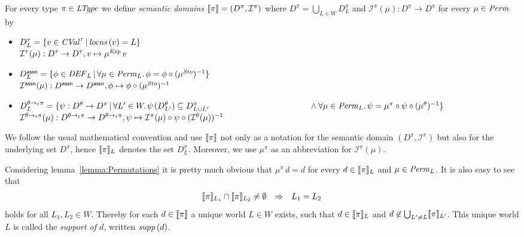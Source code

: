 \documentclass[12pt,a4paper]{report}
\newcommand{\CVal}{\nstyle{CVal}}
\newcommand{\Sto}{\nstyle{Sto}}
\newcommand{\DEF}{\nstyle{DEF}}
\newcommand{\I}{\mathcal{I}}
\begin{document}
\begin{definition}
  For every type $\pi\in\mathit{LType}$ we define {\em semantic domains} $\semantic{\pi} = (D^\pi,\I^\pi)$ where
  $D^\pi = \bigcup_{L \in W} D^\pi_L$ and $\I^\pi(\mu) : D^\pi \to D^\pi$ for every $\mu \in \mathit{Perm}$ by
  \begin{itemize}
    \item $D^\tau_L = \{v\in\CVal^\tau\,|\,\locns{v} = L\}$ \\
          $\I^\tau(\mu): D^\tau \to D^\tau, v \mapsto \mu^\Exp\,v$

    \item $D^\tassn_L = \{ \phi\in\DEF_L\,|\,\forall \mu\in\Perm_L.\,\phi = \phi \circ (\mu^\Sto)^{-1}\}$ \\
          $\I^\tassn(\mu): D^\tassn \to D^\tassn, \phi \mapsto \phi \circ (\mu^\Sto)^{-1}$

    \item $D^{\ttarrow{\theta}{\pi}}_L = \{ \psi: D^\theta \to D^\pi\,|\,
                          \forall L'\in W.\,\psi\,(D^\theta_{L'}) \subseteq D^\pi_{L \cup L'} \\
                          \hspace*{4.2cm} \wedge \forall \mu\in\Perm_L.\,\psi=\mu^\pi\circ\psi\circ(\mu^\theta)^{-1}\}$\\
          $\I^{\ttarrow{\theta}{\pi}}(\mu): D^{\ttarrow{\theta}{\pi}} \to D^{\ttarrow{\theta}{\pi}},
                                            \psi \mapsto \I^\pi(\mu) \circ \psi \circ (\I^\theta(\mu))^{-1}$
  \end{itemize}
\end{definition}

We follow the usual mathematical convention and use $\llbracket\pi\rrbracket$ not only as a notation
for the semantic domain $(D^\pi,\I^\pi)$ but also for the underlying set $D^\pi$,
hence $\llbracket\pi\rrbracket_L$ denotes the set $D^\pi_L$. Moreover, we use $\mu^\pi$ as an abbreviation
for $\I^\pi(\mu)$.

Considering lemma~\ref{lemma:Permutations}
it is pretty much obvious that $\mu^\pi\,d = d$ for every $d \in \llbracket\pi\rrbracket_L$ and
$\mu\in\mathit{Perm}_L$.
It is also easy to see that
\[\begin{array}{rcl}
  \llbracket\pi\rrbracket_{L_1} \cap \llbracket\pi\rrbracket_{L_2} \ne \emptyset &\Rightarrow& L_1=L_2
\end{array}\]
holds for all $L_1,L_2\in W$. Thereby for each $d \in \llbracket\pi\rrbracket$ a
unique world $L \in W$ exists, such that $d \in \llbracket\pi\rrbracket_L$ and $d \not\in \bigcup_{L'\ne L} \llbracket\pi\rrbracket_{L'}$.
This unique world $L$
is called the {\em support of $d$}, written $\mathit{supp}\,(d)$.
\end{document}
